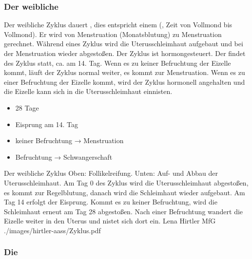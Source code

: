 \subsubsection{Der weibliche }
\label{topic:weiblicher-zyklus}

\TextSlide{\TxBeschreibung}
{%
Der weibliche Zyklus dauert , dies entspricht
einem  (, Zeit von Vollmond bis Vollmond). 
%
Er wird von Menstruation (Monatsblutung) zu Menstruation gerechnet.
%
Während eines Zyklus wird die Uterusschleimhaut aufgebaut
und bei der Menstruation wieder abgestoßen.
%
Der Zyklus ist 
hormongesteuert. 
%
Der  findet 
des Zyklus statt, ca. am 14. Tag. Wenn es zu keiner
Befruchtung der Eizelle kommt, läuft der Zyklus normal
weiter, es kommt zur Menstruation.
Wenn es zu einer Befruchtung der Eizelle kommt, wird der
Zyklus hormonell angehalten und die Eizelle kann sich in die
Uterusschleimhaut einnisten.
}{
\begin{itemize}
  \item 28 Tage
  \item Eisprung am 14. Tag 
  \item keiner Befruchtung → Menstruation
  \item Befruchtung → Schwangerschaft
\end{itemize}
}
{}{}{}




\PictureWide
{Der weibliche Zyklus}%
{Oben:
Follikelreifung. Unten: Auf- und Abbau der
Uterusschleimhaut. Am Tag 0 des Zyklus wird die
Uterusschleimhaut abgestoßen, es kommt zur Regelblutung,
danach wird die Schleimhaut wieder aufgebaut. Am Tag 14
erfolgt der Eisprung.
Kommt es zu keiner Befruchtung, wird die Schleimhaut erneut
am Tag 28 abgestoßen. Nach einer Befruchtung wandert die
Eizelle weiter in den Uterus und nistet sich dort ein.}%
{}%
{Lena Hirtler}%
{MfG}%
{./images/hirtler-aass/Zyklus.pdf}%
{}%
{}%





\subsubsection{Die }


